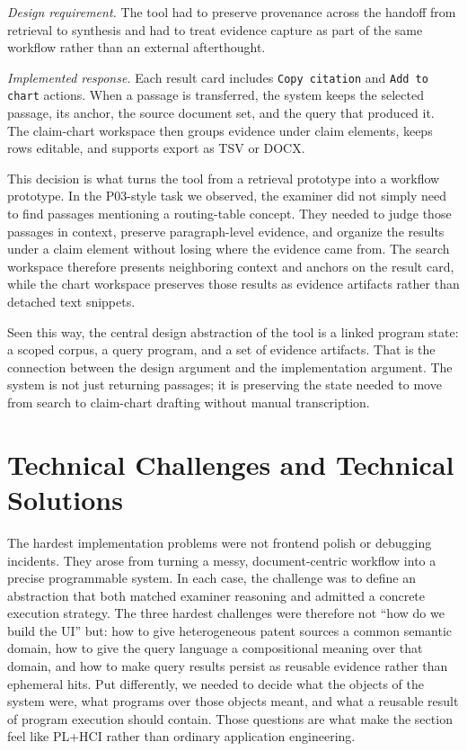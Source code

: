 \documentclass[sigconf]{acmart}
\begin{document}
\emph{Design requirement.} The tool had to preserve provenance across the
handoff from retrieval to synthesis and had to treat evidence capture as part
of the same workflow rather than an external afterthought.

\emph{Implemented response.} Each result card includes \texttt{Copy citation}
and \texttt{Add to chart} actions. When a passage is transferred, the system
keeps the selected passage, its anchor, the source document set, and the query
that produced it. The claim-chart workspace then groups evidence under claim
elements, keeps rows editable, and supports export as TSV or DOCX.

This decision is what turns the tool from a retrieval prototype into a workflow
prototype. In the P03-style task we observed, the examiner did not simply need
to find passages mentioning a routing-table concept. They needed to judge those
passages in context, preserve paragraph-level evidence, and organize the
results under a claim element without losing where the evidence came from. The
search workspace therefore presents neighboring context and anchors on the
result card, while the chart workspace preserves those results as evidence
artifacts rather than detached text snippets.

Seen this way, the central design abstraction of the tool is a linked program
state: a scoped corpus, a query program, and a set of evidence artifacts. That
is the connection between the design argument and the implementation argument.
The system is not just returning passages; it is preserving the state needed to
move from search to claim-chart drafting without manual transcription.


\section{Technical Challenges and Technical Solutions}

The hardest implementation problems were not frontend polish or debugging
incidents. They arose from turning a messy, document-centric workflow into a
precise programmable system. In each case, the challenge was to define an
abstraction that both matched examiner reasoning and admitted a concrete
execution strategy. The three hardest challenges were therefore not ``how do we
build the UI'' but: how to give heterogeneous patent sources a common semantic
domain, how to give the query language a compositional meaning over that domain,
and how to make query results persist as reusable evidence rather than
ephemeral hits. Put differently, we needed to decide what the objects of the
system were, what programs over those objects meant, and what a reusable result
of program execution should contain. Those questions are what make the section
feel like PL+HCI rather than ordinary application engineering.
\end{document}
